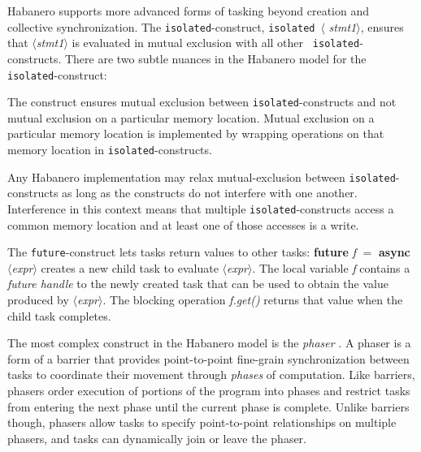 Habanero supports more advanced forms of tasking beyond creation and
collective synchronization. The \texttt{isolated}-construct, {\tt isolated}~$\langle${\it
  stmt1}$\rangle$, ensures that $\langle${\it stmt1}$\rangle$ is
evaluated in mutual exclusion with all other {\tt
  isolated}-constructs.  There are two subtle nuances in the Habanero
model for the \texttt{isolated}-construct:
\begin{compactenum}
\item The construct ensures mutual exclusion between \texttt{isolated}-constructs and not mutual exclusion on a particular memory location. Mutual exclusion on a particular memory location is implemented by wrapping operations on that memory location in \texttt{isolated}-constructs. 
\item Any Habanero implementation may relax mutual-exclusion between
  \texttt{isolated}-constructs as long as the constructs do not
  interfere with one another. Interference in this context means that
  multiple \texttt{isolated}-constructs access a common memory
  location and at least one of those accesses is a write.
\end{compactenum}

The \texttt{future}-construct lets tasks
return values to other tasks: \textbf{future} {\em f} $=$ \textbf{async}
  $\langle${\em expr}$\rangle$ creates a new child task to evaluate $\langle${\em expr}$\rangle$.  The local
variable {\em f} contains a \emph{future handle} to the newly created
task that can be used to obtain the value produced by $\langle${\em expr}$\rangle$. The blocking operation {\em f.get()} returns that value when the
child task completes.

The most complex construct in the Habanero model is the
\textit{phaser} \cite{Shirako:2008:PUD:1375527.1375568}. A phaser is a form of a barrier that provides
point-to-point fine-grain synchronization between tasks to coordinate
their movement through \emph{phases} of computation. Like barriers, phasers order execution of
portions of the program into phases and restrict tasks from
entering the next phase until the current phase is complete. Unlike
barriers though, phasers allow tasks to specify point-to-point relationships on
multiple phasers, and tasks can dynamically join or leave the phaser.

